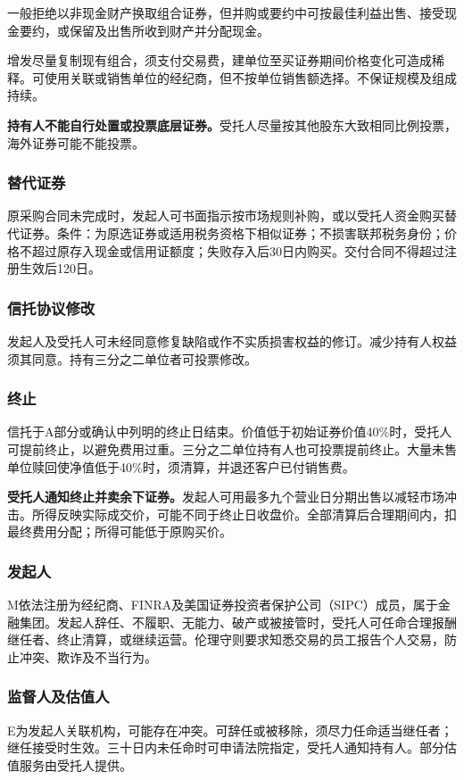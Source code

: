 \documentclass[UTF8,fontset=none,11pt,a4paper]{ctexart}
\begin{document}
一般拒绝以非现金财产换取组合证券，但并购或要约中可按最佳利益出售、接受现金要约，或保留及出售所收到财产并\allowbreak\mbox{分配现金。}


增发尽量复制现有组合，须支付交易费，建单位至买证券期间价格变化可造成稀释。可使用关联或销售单位的经纪商，但不按单位销售额选择。不保证规模及\allowbreak\mbox{组成持续。}


\textbf{持有人不能自行处置或投票底层证券。}受托人尽量按其他股东大致相同比例投票，海外证券可能\allowbreak\mbox{不能投票。}


\subsubsection*{替代证券}
原采购合同未完成时，发起人可书面指示按市场规则补购，或以受托人资金购买替代证券。条件：为原选证券或适用税务资格下相似证券；不损害联邦税务身份；价格不超过原存入现金或信用证额度；失败存入后30日内购买。交付合同不得超过注册生效后120日。


\subsubsection*{信托协议修改}
发起人及受托人可未经同意修复缺陷或作不实质损害权益的修订。减少持有人权益须其同意。持有三分之二单位者可\allowbreak\mbox{投票修改。}


\subsubsection*{终止}
信托于A部分或确认中列明的终止日结束。价值低于初始证券价值40\%时，受托人可提前终止，以避免费用过重。三分之二单位持有人也可投票提前终止。大量未售单位赎回使净值低于40\%时，须清算，并退还客户已\allowbreak\mbox{付销售费。}


\textbf{受托人通知终止并卖余下证券。}发起人可用最多九个营业日分期出售以减轻市场冲击。所得反映实际成交价，可能不同于终止日收盘价。全部清算后合理期间内，扣最终费用分配；所得可能低于\allowbreak\mbox{原购买价。}


\subsubsection*{发起人}
M依法注册为经纪商、FINRA及美国证券投资者保护公司（SIPC）成员，属于金融集团。发起人辞任、不履职、无能力、破产或被接管时，受托人可任命合理报酬继任者、终止清算，或继续运营。伦理守则要求知悉交易的员工报告个人交易，防止冲突、欺诈及不\allowbreak\mbox{当行为。}


\subsubsection*{监督人及估值人}
E为发起人关联机构，可能存在冲突。可辞任或被移除，须尽力任命适当继任者；继任接受时生效。三十日内未任命时可申请法院指定，受托人通知持有人。部分估值服务由受\allowbreak\mbox{托人提供。}
\end{document}
